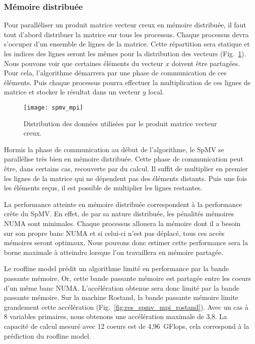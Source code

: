 \subsubsection{Mémoire distribuée}
Pour paralléliser un produit matrice vecteur creux en mémoire distribuée, il faut tout d'abord distribuer la matrice sur tous les processus.
%
Chaque processus devra s'occuper d'un ensemble de lignes de la matrice.
%
Cette répartition sera statique et les indices des lignes seront les mêmes pour la distribution des vecteurs (Fig.~\ref{fig:spmv_mpi}).
%
Nous pouvons voir que certaines éléments du vecteur $x$ doivent être partagées.
%
Pour cela, l'algorithme démarrera par une phase de communication de ces éléments.
%
Puis chaque processus pourra effectuer la multiplication de ces lignes de matrice et stocker le résultat dans un vecteur $y$ local.

\begin{figure}
  \centering
  \texttt{[image: spmv\_mpi]}
  \caption{Distribution des données utilisées par le produit matrice vecteur creux.}
  \label{fig:spmv_mpi}
\end{figure}

Hormis la phase de communication au début de l'algorithme, le SpMV se parallélise très bien en mémoire distribuée.
%
Cette phase de communication peut être, dans certains cas, recouverte par du calcul.
%
Il suffit de multiplier en premier les lignes de la matrice qui ne dépendent pas des éléments distants.
%
Puis une fois les éléments reçus, il est possible de multiplier les lignes restantes.



La performance atteinte en mémoire distribuée correspondent à la performance crête du SpMV.
%
En effet, de par sa nature distribuée, les pénalités mémoires NUMA sont minimales.
%
Chaque processus allouera la mémoire dont il a besoin sur son propre banc NUMA et si celui-ci n'est pas déplacé, tous ces accès mémoires seront optimaux.
%
Nous pouvons donc estimer cette performance sera la borne maximale à atteindre lorsque l'on travaillera en mémoire partagée.




Le roofline model prédit un algorithme limité en performance par la bande passante mémoire.
%
Or, cette bande passante mémoire est partagée entre les coeurs d'un même banc NUMA.
%
L'accélération obtenue sera donc limité par la bande passante mémoire.
%
Sur la machine Rostand, la bande passante mémoire limite grandement cette accélération (Fig.~\ref{fig:res_spmv_mpi_rostand}).
%
Avec un cas à 8 variables primaires, nous obtenons une accélération maximale de 3,8.
%
La capacité de calcul mesuré avec 12 coeurs est de 4,96~GFlops, cela correspond à la prédiction du roofline model.



